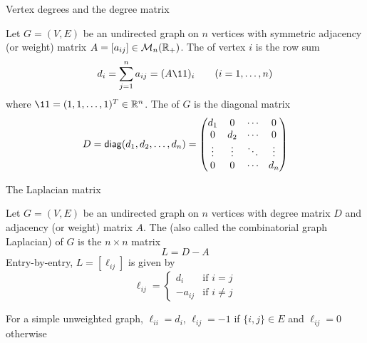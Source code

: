 \documentclass[aspectratio=169]{beamer}\usepackage[]{graphicx}\usepackage[]{xcolor}
\begin{document}
\begin{frame}{Vertex degrees and the degree matrix}
\begin{importantdefinition}
Let $G = (V, E)$ be an undirected graph on $n$ vertices with symmetric adjacency (or weight) matrix $A = [a_{ij}] \in \mathcal{M}_n(\mathbb{R}_+)$. The  of vertex $i$ is the row sum
\[
d_i = \sum_{j=1}^n a_{ij} = (A\11)_i \qquad (i = 1, \ldots, n)
\]
where $\11 = (1, 1, \ldots, 1)^T \in \IR^n$. The  of $G$ is the diagonal matrix
\[
D = \mathsf{diag}(d_1, d_2, \ldots, d_n) = \begin{pmatrix}
d_1 & 0 & \cdots & 0 \\
0 & d_2 & \cdots & 0 \\
\vdots & \vdots & \ddots & \vdots \\
0 & 0 & \cdots & d_n
\end{pmatrix}
\]
\end{importantdefinition}
\end{frame}


\begin{frame}{The Laplacian matrix}
\begin{importantdefinition}
Let $G = (V, E)$ be an undirected graph on $n$ vertices with degree matrix $D$ and adjacency (or weight) matrix $A$.
The  (also called the combinatorial graph Laplacian) of $G$ is the $n \times n$ matrix
\[
L = D - A
\]
Entry-by-entry, $L = [\ell_{ij}]$ is given by
\[
\ell_{ij} = \begin{cases}
d_i & \text{if } i = j \\
-a_{ij} & \text{if } i \neq j
\end{cases}
\]
\end{importantdefinition}
\vfill
For a simple unweighted graph, $\ell_{ii} = d_i$, $\ell_{ij} = -1$ if $\{i, j\} \in E$ and $\ell_{ij} = 0$ otherwise
\end{frame}
\end{document}
